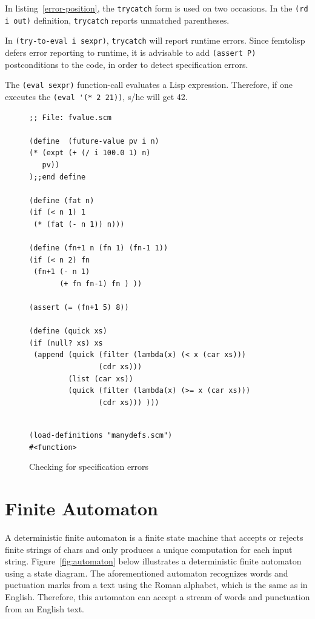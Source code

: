\documentclass[a4paper,12pt]{book}
\newenvironment{fmpage}[1]
           {\begin{lrbox}{\fmbox}\begin{minipage}{#1}}
           {\end{minipage}\end{lrbox}\fbox{\usebox{\fmbox}}}
\begin{document}
In listing~\ref{error-position},
the \verb|trycatch| form is used on
two occasions. In the \verb|(rd i out)|
definition, \verb|trycatch| reports
unmatched parentheses.

In \verb|(try-to-eval i sexpr)|,
\verb|trycatch| will report runtime
errors. Since femtolisp defers
error reporting to runtime, it is
advisable to add \verb|(assert P)|
postconditions to the code, in
order to detect specification
errors.

The \verb|(eval sexpr)| function-call
evaluates a Lisp expression. Therefore,
if one executes the \verb|(eval '(* 2 21))|,
s/he  will get 42.

\begin{figure}[!h]
\begin{fmpage}{0.9\textwidth}
\begin{verbatim}
;; File: fvalue.scm

(define  (future-value pv i n)
(* (expt (+ (/ i 100.0 1) n) 
   pv))
);;end define

(define (fat n)
(if (< n 1) 1
 (* (fat (- n 1)) n)))

(define (fn+1 n (fn 1) (fn-1 1))
(if (< n 2) fn
 (fn+1 (- n 1)
       (+ fn fn-1) fn ) ))

(assert (= (fn+1 5) 8))

(define (quick xs)
(if (null? xs) xs
 (append (quick (filter (lambda(x) (< x (car xs))) 
                (cdr xs)))
         (list (car xs))
         (quick (filter (lambda(x) (>= x (car xs)))
                (cdr xs))) )))


\end{verbatim}
\end{fmpage}

\begin{fmpage}{0.9\textwidth}
\verb|(load-definitions "manydefs.scm")|\\
\verb|#<function>|
\end{fmpage}
\caption{Checking for specification errors}
\label{debug-ready-source}
\end{figure}



\chapter{Finite Automaton}
\label{chap:finite-automaton}
A deterministic finite automaton
is a finite state machine that accepts or rejects
finite strings of chars and only produces
a unique computation  for each input string.
Figure~\ref{fig:automaton} below illustrates a deterministic
finite automaton using a state diagram.
The aforementioned automaton recognizes words
and puctuation marks from a text using
the Roman alphabet, which is the same
as in English. Therefore,
this automaton can  accept a
stream of words and punctuation from an English text.
\end{document}
